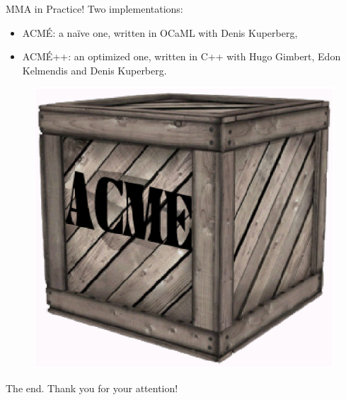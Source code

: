 \documentclass[svgnames]{beamer}
\begin{document}
\begin{frame}{MMA in Practice!}
Two implementations:
\begin{itemize}
	\item ACM\'E: a na\"ive one, written in OCaML with Denis Kuperberg,
	\item ACM\'E++: an optimized one, written in C++ with Hugo Gimbert, Edon Kelmendis and Denis Kuperberg.
\end{itemize}
\begin{figure}
\begin{center}
\includegraphics[scale=.1]{acme}
\end{center}
\end{figure}
\end{frame}

\begin{frame}{The end.}
Thank you for your attention!
\end{frame}

\begin{tiny}


\end{tiny}
\end{document}
